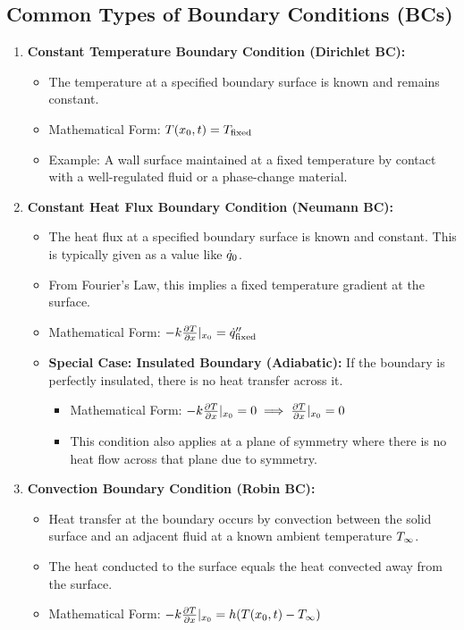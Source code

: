 \subsection{Common Types of Boundary Conditions (BCs)}
\begin{enumerate}
    \item \textbf{Constant Temperature Boundary Condition (Dirichlet BC):}
        \begin{itemize}
            \item The temperature at a specified boundary surface is known and remains constant.
            \item Mathematical Form: $T(x_0, t) = T_{\text{fixed}}$
            \item Example: A wall surface maintained at a fixed temperature by contact with a well-regulated fluid or a phase-change material.
        \end{itemize}

    \item \textbf{Constant Heat Flux Boundary Condition (Neumann BC):}
        \begin{itemize}
            \item The heat flux at a specified boundary surface is known and constant. This is typically given as a value like $\dot{q}_0$.
            \item From Fourier's Law, this implies a fixed temperature gradient at the surface.
            \item Mathematical Form: $-k \frac{\partial T}{\partial x}|_{x_0} = \dot{q}_{\text{fixed}}''$
            \item \textbf{Special Case: Insulated Boundary (Adiabatic):} If the boundary is perfectly insulated, there is no heat transfer across it.
                \begin{itemize}
                    \item Mathematical Form: $-k \frac{\partial T}{\partial x}|_{x_0} = 0 \implies \frac{\partial T}{\partial x}|_{x_0} = 0$
                    \item This condition also applies at a plane of symmetry where there is no heat flow across that plane due to symmetry.
                \end{itemize}
        \end{itemize}

    \item \textbf{Convection Boundary Condition (Robin BC):}
        \begin{itemize}
            \item Heat transfer at the boundary occurs by convection between the solid surface and an adjacent fluid at a known ambient temperature $T_{\infty}$.
            \item The heat conducted to the surface equals the heat convected away from the surface.
            \item Mathematical Form: $-k \frac{\partial T}{\partial x}|_{x_0} = h (T(x_0, t) - T_{\infty})$
        \end{itemize}


\end{enumerate}
